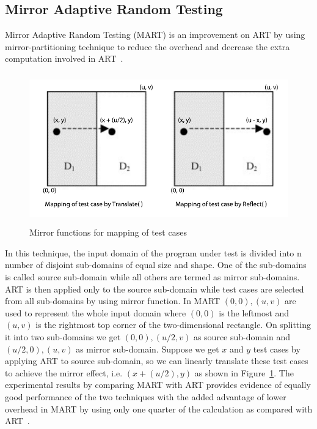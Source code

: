 \subsection{Mirror Adaptive Random Testing}
Mirror Adaptive Random Testing (MART) is an improvement on ART by using mirror-partitioning technique to reduce the overhead and decrease the extra computation involved in ART~\cite{chen2004mirror}. 
\bigskip
\bigskip
\begin{figure}[h]
\begin{center}
	\includegraphics[width=13.5cm, height=6.5cm ]{chapter2/mart2.pdf}
	\bigskip
	\caption{Mirror functions for mapping of test cases}
\label{fig:mirrorART}
\end{center}  
\end{figure}
\bigskip

In this technique, the input domain of the program under test is divided into n number of disjoint sub-domains of equal size and shape. One of the sub-domains is called source sub-domain while all others are termed as mirror sub-domains. ART is then applied only to the source sub-domain while test cases are selected from all sub-domains by using mirror function. In MART $(0, 0), (u, v)$ are used to represent the whole input domain where $(0, 0)$ is the leftmost and $(u, v)$ is the rightmost top corner of the two-dimensional rectangle. On splitting it into two sub-domains we get $(0, 0), (u/2, v)$ as source sub-domain and $(u/2, 0), (u, v)$ as mirror sub-domain. Suppose we get $x$ and $y$ test cases by applying ART to source sub-domain, so we can linearly translate these test cases to achieve the mirror effect, i.e. $(x + (u/2), y)$ as shown in Figure~\ref{fig:mirrorART}. The experimental results by comparing MART with ART provides evidence of equally good performance of the two techniques with the added advantage of lower overhead in MART by using only one quarter of the calculation as compared with ART~\cite{chen2004mirror}.


